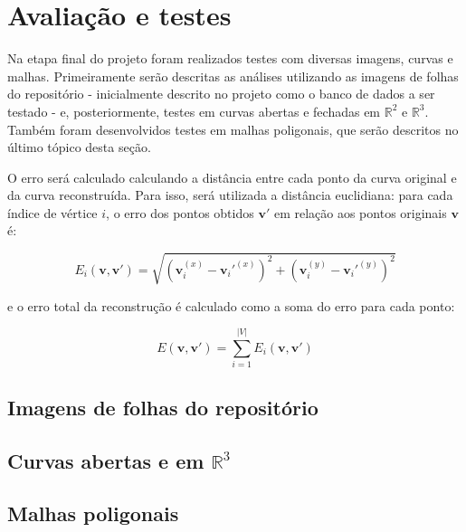 \section{Avaliação e testes}\label{sec:avaliacao}

Na etapa final do projeto foram realizados testes com diversas imagens, curvas e malhas. Primeiramente serão descritas as análises utilizando as imagens de folhas do repositório  - inicialmente descrito no projeto como o banco de dados a ser testado - e, posteriormente, testes em curvas abertas e fechadas em $\mathbb{R}^2$ e $\mathbb{R}^3$. Também foram desenvolvidos testes em malhas poligonais, que serão descritos no último tópico desta seção.

O erro será calculado calculando a distância entre cada ponto da curva original e da curva reconstruída. Para isso, será utilizada a distância euclidiana: para cada índice de vértice $i$, o erro dos pontos obtidos $\mathbf{v'}$ em relação aos pontos originais $\mathbf{v}$ é:

$$E_i(\mathbf{v, v'}) = \sqrt{(\mathbf v_i^{(x)} - \mathbf v_i'^{(x)})^2 + (\mathbf v_i^{(y)} - \mathbf v_i'^{(y)})^2}$$

\noindent e o erro total da reconstrução é calculado como a soma do erro para cada ponto:

$$E(\mathbf{v, v'}) = \sum_{i = 1}^{|V|}E_i(\mathbf{v, v'})$$

\subsection{Imagens de folhas do repositório }


\subsection{Curvas abertas e em $\mathbb{R}^3$}


\subsection{Malhas poligonais}


